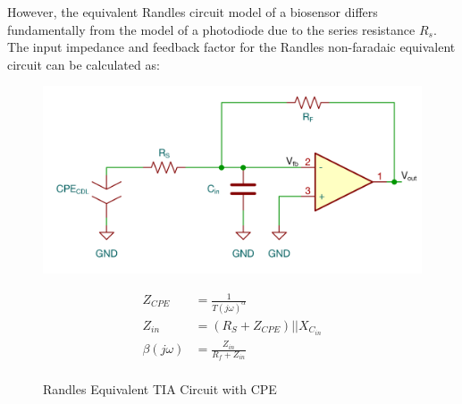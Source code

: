 However, the equivalent Randles circuit model of a biosensor differs fundamentally from the model of a photodiode due to the series resistance $R_s$. The input impedance and feedback factor for the Randles non-faradaic equivalent circuit can be calculated as:
\begin{figure}[H]
    \centering
    \begin{minipage}[t]{0.48\textwidth}
        \vspace{0pt}
        \centering
        \includegraphics[width=\textwidth]{RandlesTIA.png}
        \caption{Randles Equivalent TIA Circuit with CPE}
        \label{fig:randles_cpe_tia}
    \end{minipage}\hfill
    \begin{minipage}[t]{0.48\textwidth}
        \vspace{0pt}
        \begin{align}
            Z_{CPE} &= \frac{1}{T(j\omega)^{\alpha}} \\
            Z_{in} &= (R_S + Z_{CPE}) || X_{C_{in}} \\
            \beta (j\omega) &= \frac{Z_{in}}{R_f + Z_{in}} \label{eq:randles_beta}\\
        \end{align}
    \end{minipage}
\end{figure}

